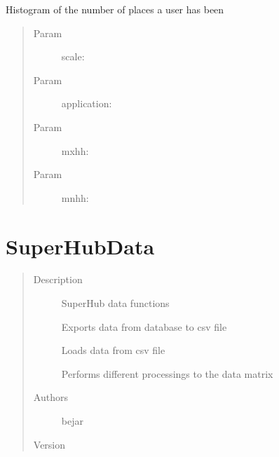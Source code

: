 \documentclass[letterpaper,10pt,english]{sphinxmanual}
\begin{document}

\begin{fulllineitems}
\label{index:SuperHubProcessing.userEventsHistogram}
Histogram of the number of places a user has been
\begin{quote}\begin{description}
\item[{Param }] \leavevmode
scale:

\item[{Param }] \leavevmode
application:

\item[{Param }] \leavevmode
mxhh:

\item[{Param }] \leavevmode
mnhh:

\end{description}\end{quote}

\end{fulllineitems}

\label{index:module-SuperHubData}\label{index:module-SuperHubData}

\chapter{SuperHubData}
\label{index:superhubdata}\begin{quote}\begin{description}
\item[{Description}] \leavevmode
SuperHub data functions

Exports data from database to csv file

Loads data from csv file

Performs different processings to the data matrix

\item[{Authors}] \leavevmode
bejar

\item[{Version}] 

\end{description}\end{quote}
\end{document}
